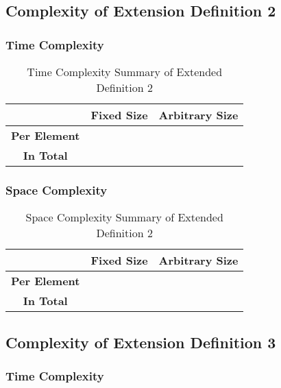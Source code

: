 \documentclass[conference]{IEEEtran}
\begin{document}
\subsection{Complexity of Extension Definition 2}
\label{ca:pn_d02}

\subsubsection{Time Complexity}

\begin{table}[H]
    \centering
    \caption{Time Complexity Summary of Extended Definition 2}
    \begin{tabular}{|c|c|c|}
        \hline
        & \textbf{Fixed Size} & \textbf{Arbitrary Size} \\
        \hline
        \textbf{Per Element} &  &  \\
        \hline
        \textbf{In Total} &  &  \\
        \hline
    \end{tabular}
    \label{tab:time_pn_d02}
\end{table}

\subsubsection{Space Complexity}

\begin{table}[H]
    \centering
    \caption{Space Complexity Summary of Extended Definition 2}
    \begin{tabular}{|c|c|c|}
        \hline
        & \textbf{Fixed Size} & \textbf{Arbitrary Size} \\
        \hline
        \textbf{Per Element} &  &  \\
        \hline
        \textbf{In Total} &  &  \\
        \hline
    \end{tabular}
    \label{tab:space_pn_d02}
\end{table}

\subsection{Complexity of Extension Definition 3}
\label{ca:pn_d03}

\subsubsection{Time Complexity}
\end{document}
